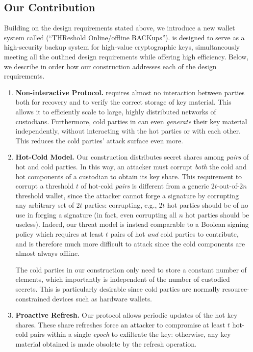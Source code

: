 \subsection{Our Contribution}
Building on the design requirements stated above, we introduce a new wallet system called \sysname (``THReshold Online/offline BACKups''). \sysname is designed to serve as a high-security backup system for high-value cryptographic keys, simultaneously meeting all the outlined design requirements while offering high efficiency.
Below, we describe in order how our construction addresses each of the design requirements.

\begin{enumerate}
    \item \textbf{Non-interactive Protocol.}
    \sysname requires almost no interaction between parties both for recovery and to verify the correct storage of key material. This allows it to efficiently scale to large, highly distributed networks of custodians. Furthermore, cold parties in \sysname can even \emph{generate} their key material independently, without interacting with the hot parties or with each other. This reduces the cold parties' attack surface even more.
    \item \textbf{Hot-Cold Model.} 
    Our construction distributes secret shares among \emph{pairs} of hot and cold parties. In this way, an attacker must corrupt \emph{both} the cold and hot components of a custodian to obtain its key share. This requirement to corrupt a threshold $t$ of hot-cold \emph{pairs} is different from a generic $2t$-out-of-$2n$ threshold wallet, since the attacker cannot forge a signature by corrupting any arbitrary set of $2t$ parties: corrupting, e.g., $2t$ hot parties should be of no use in forging a signature (in fact, even corrupting all $n$ hot parties should be useless). Indeed, our threat model is instead comparable to a Boolean signing policy which requires at least $t$ pairs of hot \emph{and} cold parties to contribute, and is therefore much more difficult to attack since the cold components are almost always offline.
    
    The cold parties in our construction only need to store a constant number of elements, which importantly is independent of the number of custodied secrets. This is particularly desirable since cold parties are normally resource-constrained devices such as hardware wallets.
    
    \item \textbf{Proactive Refresh.}
    Our protocol allows periodic updates of the hot key shares. %
    These share refreshes force an attacker to compromise at least $t$ hot-cold pairs within a single \emph{epoch} to exfiltrate the key: otherwise, any key material obtained is made obsolete by the refresh operation. 
    

\end{enumerate}
